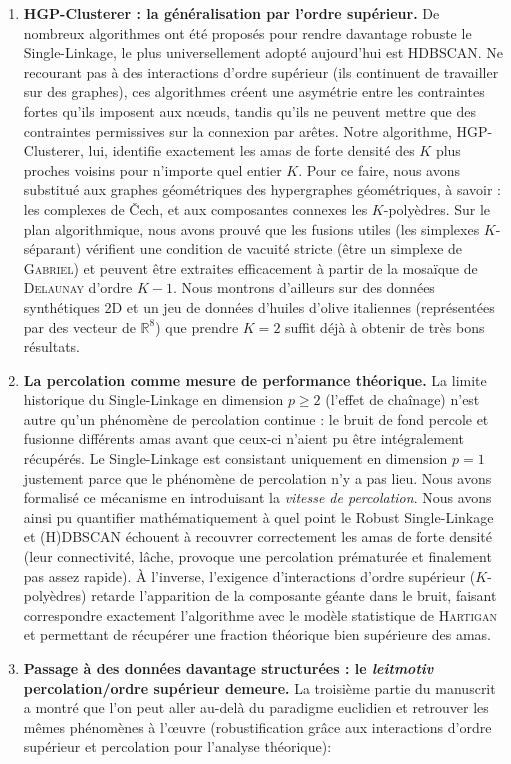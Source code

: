 \begin{enumerate}
    \item \textbf{HGP-Clusterer : la généralisation par l'ordre supérieur.} De nombreux algorithmes ont été proposés pour rendre davantage robuste le Single-Linkage, le plus universellement adopté aujourd'hui est HDBSCAN. Ne recourant pas à des interactions d'ordre supérieur (ils continuent de travailler sur des graphes), ces algorithmes créent une asymétrie entre les contraintes fortes qu'ils imposent aux nœuds, tandis qu'ils ne peuvent mettre que des contraintes permissives sur la connexion par arêtes.  Notre algorithme, HGP-Clusterer, lui, identifie exactement les amas de forte densité des $K$ plus proches voisins pour n'importe quel entier $K$. Pour ce faire, nous avons substitué aux graphes géométriques des hypergraphes géométriques, à savoir : les complexes de \v Cech, et aux composantes connexes les $K$-polyèdres. Sur le plan algorithmique, nous avons prouvé que les fusions utiles (les simplexes $K$-séparant) vérifient une condition de vacuité stricte (être un simplexe de \textsc{Gabriel}) et peuvent être extraites efficacement à partir de la mosaïque de \textsc{Delaunay} d'ordre $K-1$. Nous montrons d'ailleurs sur des données synthétiques 2D et un jeu de données d'huiles d'olive italiennes (représentées par des vecteur de $\mathbb R^8$) que prendre $K=2$ suffit déjà à obtenir de très bons résultats.
    \item \textbf{La percolation comme mesure de performance théorique.} La limite historique du Single-Linkage en dimension $p \ge 2$ (l'effet de chaînage) n'est autre qu'un phénomène de percolation continue : le bruit de fond percole et fusionne différents amas avant que ceux-ci n'aient pu être intégralement récupérés. Le Single-Linkage est consistant uniquement en dimension $p=1$ justement parce que le phénomène de percolation n'y a pas lieu. Nous avons formalisé ce mécanisme en introduisant la \emph{vitesse de percolation}. Nous avons ainsi pu quantifier mathématiquement à quel point le Robust Single-Linkage et (H)DBSCAN échouent à recouvrer correctement les amas de forte densité (leur connectivité, lâche, provoque une percolation prématurée et finalement pas assez rapide). À l'inverse, l'exigence d'interactions d'ordre supérieur ($K$-polyèdres) retarde l'apparition de la composante géante dans le bruit, faisant correspondre exactement l'algorithme avec le modèle statistique de \textsc{Hartigan} et permettant de récupérer une fraction théorique bien supérieure des amas.
    \item \textbf{Passage à des données davantage structurées : le \emph{leitmotiv} percolation/ordre supérieur demeure.} La troisième partie du manuscrit a montré que l'on peut aller au-delà du paradigme euclidien et retrouver les mêmes phénomènes à l'œuvre (robustification grâce aux interactions d'ordre supérieur et percolation pour l'analyse théorique):

\end{enumerate}
